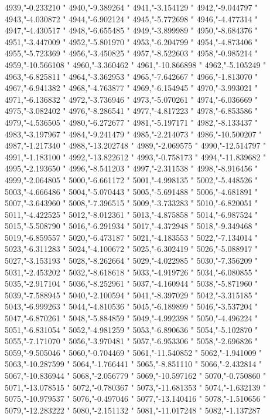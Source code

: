 4939,"-0.233210
"
4940,"-9.389264
"
4941,"-3.154129
"
4942,"-9.044797
"
4943,"-4.030872
"
4944,"-6.902124
"
4945,"-5.772698
"
4946,"-4.477314
"
4947,"-4.430517
"
4948,"-6.655485
"
4949,"-3.899989
"
4950,"-8.684376
"
4951,"-3.447009
"
4952,"-5.801970
"
4953,"-6.204799
"
4954,"-4.873406
"
4955,"-5.723369
"
4956,"-3.450825
"
4957,"-8.522603
"
4958,"-0.985214
"
4959,"-10.566108
"
4960,"-3.360462
"
4961,"-10.866898
"
4962,"-5.105249
"
4963,"-6.825811
"
4964,"-3.362953
"
4965,"-7.642667
"
4966,"-1.813070
"
4967,"-6.941382
"
4968,"-4.763877
"
4969,"-6.154945
"
4970,"-3.993021
"
4971,"-6.136832
"
4972,"-3.736946
"
4973,"-5.070261
"
4974,"-6.036669
"
4975,"-3.082402
"
4976,"-8.286541
"
4977,"-4.817223
"
4978,"-6.853586
"
4979,"-4.536505
"
4980,"-6.272677
"
4981,"-5.197171
"
4982,"-8.133437
"
4983,"-3.197967
"
4984,"-9.241479
"
4985,"-2.214073
"
4986,"-10.500207
"
4987,"-1.217340
"
4988,"-13.202748
"
4989,"-2.069575
"
4990,"-12.514797
"
4991,"-1.183100
"
4992,"-13.822612
"
4993,"-0.758173
"
4994,"-11.839682
"
4995,"-2.193650
"
4996,"-8.541203
"
4997,"-2.311538
"
4998,"-8.916456
"
4999,"-2.064805
"
5000,"-6.661172
"
5001,"-4.998135
"
5002,"-5.448526
"
5003,"-4.666486
"
5004,"-5.070443
"
5005,"-5.691488
"
5006,"-4.681891
"
5007,"-3.643960
"
5008,"-7.396515
"
5009,"-3.733283
"
5010,"-6.820051
"
5011,"-4.422525
"
5012,"-8.012361
"
5013,"-4.875858
"
5014,"-6.987524
"
5015,"-5.508790
"
5016,"-6.291934
"
5017,"-4.372948
"
5018,"-9.349468
"
5019,"-6.859557
"
5020,"-6.473187
"
5021,"-4.183553
"
5022,"-7.134014
"
5023,"-6.311283
"
5024,"-4.100672
"
5025,"-6.302419
"
5026,"-5.088917
"
5027,"-3.153193
"
5028,"-8.262664
"
5029,"-4.022985
"
5030,"-7.356209
"
5031,"-2.453202
"
5032,"-8.618618
"
5033,"-4.919726
"
5034,"-6.080855
"
5035,"-2.917104
"
5036,"-8.252961
"
5037,"-4.160944
"
5038,"-5.871960
"
5039,"-7.588945
"
5040,"-2.100594
"
5041,"-8.397029
"
5042,"-3.315185
"
5043,"-6.999263
"
5044,"-4.810536
"
5045,"-6.189899
"
5046,"-3.537204
"
5047,"-6.870261
"
5048,"-5.884859
"
5049,"-4.992398
"
5050,"-4.496224
"
5051,"-6.831054
"
5052,"-4.981259
"
5053,"-6.890636
"
5054,"-5.102870
"
5055,"-7.171070
"
5056,"-3.970481
"
5057,"-6.953306
"
5058,"-2.696826
"
5059,"-9.505046
"
5060,"-0.704469
"
5061,"-11.540852
"
5062,"-1.941009
"
5063,"-10.287599
"
5064,"-1.766441
"
5065,"-8.851110
"
5066,"-2.432814
"
5067,"-10.836944
"
5068,"-2.056779
"
5069,"-10.597162
"
5070,"-0.750860
"
5071,"-13.078515
"
5072,"-0.780367
"
5073,"-11.681353
"
5074,"-1.632139
"
5075,"-10.979537
"
5076,"-0.497046
"
5077,"-13.140416
"
5078,"-1.510656
"
5079,"-12.283222
"
5080,"-2.151132
"
5081,"-11.017248
"
5082,"-1.137287
